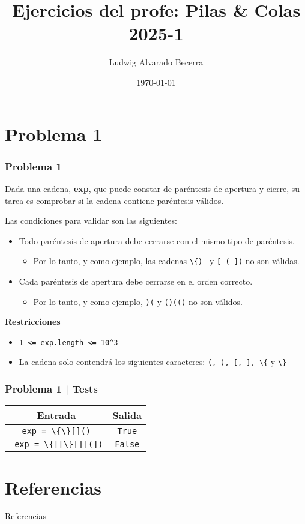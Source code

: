 \documentclass[17pt, t, lualatex]{beamer}
\title{\LARGE Ejercicios del profe: Pilas \& Colas 2025-1}
\date{\today}
\institute[UJTL]{Universidad Jorge Tadeo Lozano - Semillero de Programación Competitiva}
\author{Ludwig Alvarado Becerra}
\newcommand{\cppinline}[1]{\lstinline[style=cppstyle]!#1!}
\begin{document}
\inserttitlepage

\section{Problema 1}

\insertsectionpage


\begin{frame}
  \frametitle{Problema 1}

  Dada una cadena, \textbf{exp}, que puede constar de paréntesis de apertura y cierre, su tarea es comprobar si la cadena contiene paréntesis válidos.

  Las condiciones para validar son las siguientes:

  \begin{itemize}
    \item Todo paréntesis de apertura debe cerrarse con el mismo tipo de paréntesis.
          \begin{itemize}
            \item Por lo tanto, y como ejemplo, las cadenas \cppinline{\{) } y \cppinline{[ ( ])} no son válidas.
          \end{itemize}
    \item Cada paréntesis de apertura debe cerrarse en el orden correcto.
          \begin{itemize}
            \item Por lo tanto, y como ejemplo, \cppinline{)(} y \cppinline{()(()} no son válidos.
          \end{itemize}
  \end{itemize}

  \textbf{Restricciones}

  \begin{itemize}
    \item \cppinline{1 <= exp.length <= 10^3}
    \item La cadena solo contendrá los siguientes caracteres: \cppinline{(, ), [, ], \{} y \cppinline{\} }
  \end{itemize}

\end{frame}

\begin{frame}
  \frametitle{Problema 1 | Tests}

  \begin{table}[h]
    \centering
    \begin{tabular}[h]{|c|c|}
      \hline
      \textbf{Entrada} & \textbf{Salida} \\ \hline
      \cppinline{exp = \{\}[]()} & \cppinline{True} \\ \hline
      \cppinline{ exp = \{[[\}[]](])} & \cppinline{False} \\ \hline
    \end{tabular}
  \end{table}

\end{frame}


\section{Referencias}

\insertsectionpage
\begin{frame}[allowframebreaks]{Referencias}
  \printbibliography
\end{frame}


\insertendpage
\end{document}
